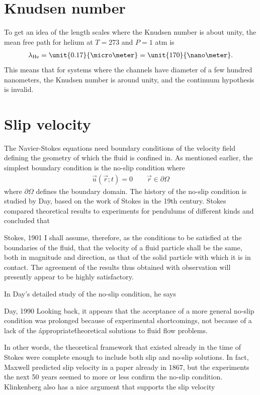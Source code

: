\section{Knudsen number}
\label{sec:knudsen_number}
To get an idea of the length scales where the Knudsen number is about unity, the mean free path for helium at $T=$\unit{273}{\kelvin} and $P=1$ atm is\cite{lillestol2001generell} 
\begin{align}
	\label{eq:helium_mfp}
	\lambda_{\text{He}} = \unit{0.17}{\micro\meter} = \unit{170}{\nano\meter}.
\end{align}
This means that for systems where the channels have diameter of a few hundred nanometers, the Knudsen number is around unity, and the continuum hypothesis is invalid. 
\section{Slip velocity}
\label{sec:slip_length}
The Navier-Stokes equations need boundary conditions of the velocity field defining the geometry of which the fluid is confined in. As mentioned earlier, the simplest boundary condition is the no-slip condition where
\begin{align}
	\vec u(\vec r; t) = 0 \qquad \vec r \in \partial\Omega
\end{align}
where $\partial\Omega$ defines the boundary domain. The history of the no-slip condition is studied by Day, based on the work of Stokes in the 19th century. Stokes compared theoretical results to experiments for pendulums of different kinds and concluded that\cite{day1990no}
\begin{aquote}{Stokes, 1901}
	I shall assume, therefore, as the conditions to be satisfied at the boundaries of the fluid, that the velocity of a fluid particle shall be the same, both in magnitude and direction, as that of the solid particle with which it is in contact. The agreement of the results thus obtained with observation will presently appear to be highly satisfactory.
\end{aquote}
In Day's detailed study of the no-slip condition, he says
\begin{aquote}{Day, 1990}
	Looking back, it appears that the acceptance of a more general no-slip condition was prolonged because of experimental shortcomings, not because of a lack of the \'appropriate\' theoretical solutions to fluid flow problems.
\end{aquote}
In other words, the theoretical framework that existed already in the time of Stokes were complete enough to include both slip and no-slip solutions. In fact, Maxwell predicted slip velocity in a paper already in 1867\cite{maxwell1879stresses}, but the experiments the next 50 years seemed to more or less confirm the no-slip condition.  Klinkenberg also has a nice argument that supports the slip velocity

